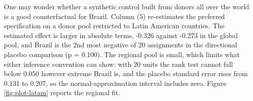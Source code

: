 \documentclass[referee,pdflatex,sn-basic]{sn-jnl}
\renewenvironment{table}[1][]{\tableorg[#1]}{\endtableorg\normalfont}
\theoremstyle{thmstylethree}
\begin{document}
One may wonder whether a synthetic control built from donors all over the world is a good counterfactual for Brazil. Column (5) re-estimates the preferred specification on a donor pool restricted to Latin American countries. The estimated effect is larger in absolute terms, -0.326 against -0.273 in the global pool, and Brazil is the 2nd most negative of 20 assignments in the directional placebo comparison (p = 0.100). The regional pool is small, which limits what either inference convention can show: with 20 units the rank test cannot fall below 0.050 however extreme Brazil is, and the placebo standard error rises from 0.131 to 0.207, so the normal-approximation interval includes zero. Figure \ref{fig:plot-latam} reports the regional fit.

\begin{table}[H]
\centering
\caption{\label{tab:outcome-robustness-table}Brazil SDiD estimates across main and robustness specifications.}
\centering
{}
\end{table}
\end{document}
